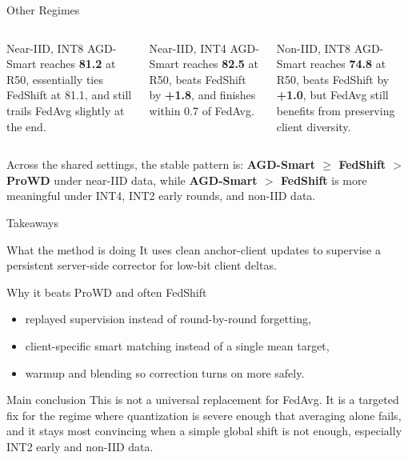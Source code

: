 \documentclass[aspectratio=169,11pt]{beamer}
\begin{document}
\begin{frame}{Other Regimes}
\begin{columns}[T,totalwidth=\textwidth]
\begin{block}{Near-IID, INT8}
\footnotesize
AGD-Smart reaches \textbf{81.2} at R50, essentially ties FedShift at 81.1, and
still trails FedAvg slightly at the end.
\end{block}

\begin{block}{Near-IID, INT4}
\footnotesize
AGD-Smart reaches \textbf{82.5} at R50, beats FedShift by \textbf{+1.8}, and
finishes within 0.7 of FedAvg.
\end{block}

\begin{block}{Non-IID, INT8}
\footnotesize
AGD-Smart reaches \textbf{74.8} at R50, beats FedShift by \textbf{+1.0}, but
FedAvg still benefits from preserving client diversity.
\end{block}
\end{columns}

\vspace{0.6em}
\small
\begin{center}
Across the shared settings, the stable pattern is:
\textbf{AGD-Smart $\geq$ FedShift $>$ ProWD} under near-IID data, while
\textbf{AGD-Smart $>$ FedShift} is more meaningful under INT4, INT2 early
rounds, and non-IID data.
\end{center}
\end{frame}

\begin{frame}{Takeaways}
\begin{block}{What the method is doing}
It uses clean anchor-client updates to supervise a persistent server-side
corrector for low-bit client deltas.
\end{block}

\begin{block}{Why it beats ProWD and often FedShift}
\begin{itemize}
  \item replayed supervision instead of round-by-round forgetting,
  \item client-specific smart matching instead of a single mean target,
  \item warmup and blending so correction turns on more safely.
\end{itemize}
\end{block}

\begin{alertblock}{Main conclusion}
This is not a universal replacement for FedAvg. It is a targeted fix for the
regime where quantization is severe enough that averaging alone fails, and it
stays most convincing when a simple global shift is not enough, especially
INT2 early and non-IID data.
\end{alertblock}
\end{frame}
\end{document}

